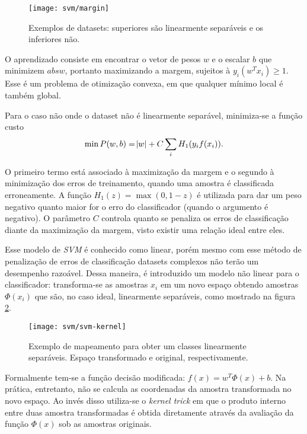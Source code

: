 \begin{figure}[h]
\centering
\texttt{[image: svm/margin]}
\caption{Exemplos de datasets: superiores são linearmente separáveis e os inferiores não.}
\label{fig:svm-margin}
\end{figure}

O aprendizado consiste em encontrar o vetor de pesos $w$ e o escalar $b$ que minimizem $abs{w}$, portanto maximizando a margem, sujeitos à $y_i(w^T x_i) \geq 1$. Esse é um problema de otimização convexa, em que qualquer mínimo local é também global.

Para o caso não onde o dataset não é linearmente separável, minimiza-se a função custo 
\begin{equation*}
	\min P(w,b) = \abs{w} + C\sum_i H_1(y_i f(x_i)).
\end{equation*} 

O primeiro termo está associado à maximização da margem e o segundo à minimização dos erros de treinamento, quando uma amostra é classificada erroneamente. A função $H_1(z)=\max(0,1-z)$ é utilizada para dar um peso negativo quanto maior for o erro do classificador (quando o argumento é negativo). O parâmetro $C$ controla quanto se penaliza os erros de classificação diante da maximização da margem, visto existir uma relação ideal entre eles.

Esse modelo de \textit{SVM} é conhecido como linear, porém mesmo com esse método de penalização de erros de classificação datasets complexos não terão um desempenho razoável. Dessa maneira, é introduzido um modelo não linear para o classificador: transforma-se as amostras $x_i$ em um novo espaço obtendo amostras $\Phi(x_i)$ que são, no caso ideal, linearmente separáveis, como mostrado na figura \ref{fig:svm-kernel}.

\begin{figure}[h]
\centering
\texttt{[image: svm/svm-kernel]}
\caption{Exemplo de mapeamento para obter um classes linearmente separáveis. Espaço transformado e original, respectivamente.}
\label{fig:svm-kernel}
\end{figure}

Formalmente tem-se a função decisão modificada: $f(x)=w^T \Phi(x) +b$.  Na prática, entretanto, não se calcula as coordenadas da amostra transformada no novo espaço. Ao invés disso utiliza-se o \textit{kernel trick} em que o produto interno entre duas amostra transformadas é obtida diretamente através da avaliação da função $\Phi(x)$ sob as amostras originais.

